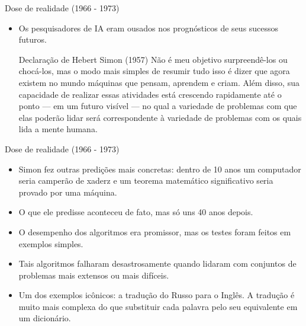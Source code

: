 \documentclass{libs/ufc_format}
\begin{document}
\begin{frame}{Dose de realidade (1966 - 1973)}
    \begin{itemize}
        \justifying
        \item Os pesquisadores de IA eram ousados nos prognósticos de seus sucessos futuros.\\
            \begin{block}{Declaração de Hebert Simon (1957)}
                \justifying
                Não é meu objetivo surpreendê-los ou chocá-los, mas o modo mais simples de resumir tudo isso é dizer que agora existem no mundo máquinas que pensam, aprendem e criam. Além disso, sua capacidade de realizar essas atividades está crescendo rapidamente até o ponto --- em um futuro visível --- no qual a variedade de problemas com que elas poderão lidar será correspondente à variedade de problemas com os quais lida a mente humana.
            \end{block}
        \end{itemize}
\end{frame}

\begin{frame}{Dose de realidade (1966 - 1973)}
    \begin{itemize}
        \justifying
        \item<1-2> Simon fez outras predições mais concretas: dentro de 10 anos um computador seria camperão de xaderz e um teorema matemático significativo seria provado por uma máquina.
        \item<2> O que ele predisse aconteceu de fato, mas só uns 40 anos depois.
        \item<3-> O desempenho dos algoritmos era promissor, mas os testes foram feitos em exemplos simples.
        \item<4-> Tais algoritmos falharam desastrosamente quando lidaram com conjuntos de problemas mais extensos ou mais difíceis.
        \item<5-> Um dos exemplos icônicos: a tradução do Russo para o Inglês. A tradução é muito mais complexa do que substituir cada palavra pelo seu equivalente em um dicionário.
    \end{itemize}
\end{frame}
\end{document}
